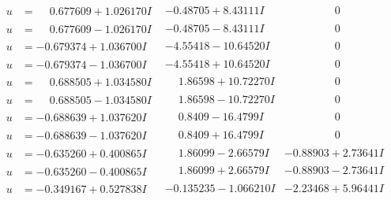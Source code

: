 \documentclass[1p]{elsarticle_modified}
\theoremstyle{definition}
\begin{document}
$$\begin{array}{c|c|c}
\begin{aligned}
u &= \phantom{-}0.677609 + 1.026170 I\end{aligned}
 & -0.48705 + 8.43111 I & \phantom{-0.000000 } 0 \\ \hline\begin{aligned}
u &= \phantom{-}0.677609 - 1.026170 I\end{aligned}
 & -0.48705 - 8.43111 I & \phantom{-0.000000 } 0 \\ \hline\begin{aligned}
u &= -0.679374 + 1.036700 I\end{aligned}
 & -4.55418 - 10.64520 I & \phantom{-0.000000 } 0 \\ \hline\begin{aligned}
u &= -0.679374 - 1.036700 I\end{aligned}
 & -4.55418 + 10.64520 I & \phantom{-0.000000 } 0 \\ \hline\begin{aligned}
u &= \phantom{-}0.688505 + 1.034580 I\end{aligned}
 & \phantom{-}1.86598 + 10.72270 I & \phantom{-0.000000 } 0 \\ \hline\begin{aligned}
u &= \phantom{-}0.688505 - 1.034580 I\end{aligned}
 & \phantom{-}1.86598 - 10.72270 I & \phantom{-0.000000 } 0 \\ \hline\begin{aligned}
u &= -0.688639 + 1.037620 I\end{aligned}
 & \phantom{-}0.8409 - 16.4799 I & \phantom{-0.000000 } 0 \\ \hline\begin{aligned}
u &= -0.688639 - 1.037620 I\end{aligned}
 & \phantom{-}0.8409 + 16.4799 I & \phantom{-0.000000 } 0 \\ \hline\begin{aligned}
u &= -0.635260 + 0.400865 I\end{aligned}
 & \phantom{-}1.86099 - 2.66579 I & -0.88903 + 2.73641 I \\ \hline\begin{aligned}
u &= -0.635260 - 0.400865 I\end{aligned}
 & \phantom{-}1.86099 + 2.66579 I & -0.88903 - 2.73641 I \\ \hline\begin{aligned}
u &= -0.349167 + 0.527838 I\end{aligned}
 & -0.135235 - 1.066210 I & -2.23468 + 5.96441 I \\ \hline\begin{aligned}

\end{aligned}
\end{array}$$
\end{document}
